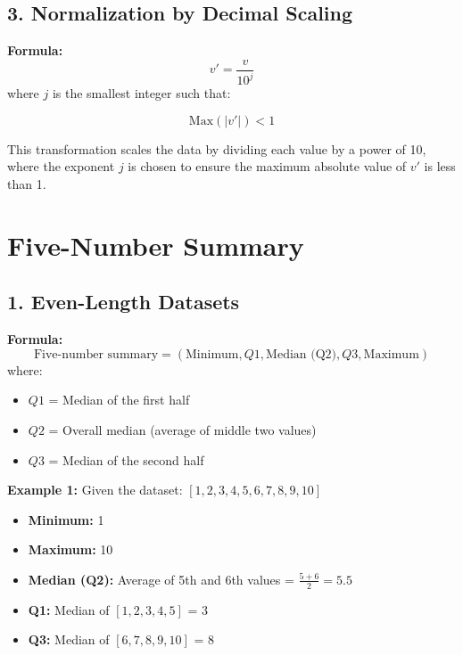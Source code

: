 \documentclass[a4paper,10pt]{article}
\begin{document}
\vspace{0.5cm}

\subsection*{3. Normalization by Decimal Scaling}

\textbf{Formula:}
\[
v' = \frac{v}{10^j}
\]
where \( j \) is the smallest integer such that:

\[
\text{Max}\left(|v'|\right) < 1
\]

This transformation scales the data by dividing each value by a power of 10, where the exponent \( j \) is chosen to ensure the maximum absolute value of \( v' \) is less than 1.

\vspace{0.5cm}

\newpage %

\section*{\centering Five-Number Summary}

\subsection*{1. Even-Length Datasets}

\textbf{Formula:}
\[
\text{Five-number summary} = (\text{Minimum}, Q1, \text{Median (Q2)}, Q3, \text{Maximum})
\]
where:
\begin{itemize}
    \item \( Q1 \) = Median of the first half
    \item \( Q2 \) = Overall median (average of middle two values)
    \item \( Q3 \) = Median of the second half
\end{itemize}

\textbf{Example 1:}  
Given the dataset: \([1, 2, 3, 4, 5, 6, 7, 8, 9, 10]\)

\begin{itemize}
    \item \textbf{Minimum:} 1
    \item \textbf{Maximum:} 10
    \item \textbf{Median (Q2):} Average of 5th and 6th values = \(\frac{5+6}{2} = 5.5\)
    \item \textbf{Q1:} Median of \([1, 2, 3, 4, 5]\) = 3
    \item \textbf{Q3:} Median of \([6, 7, 8, 9, 10]\) = 8
\end{itemize}
\end{document}
